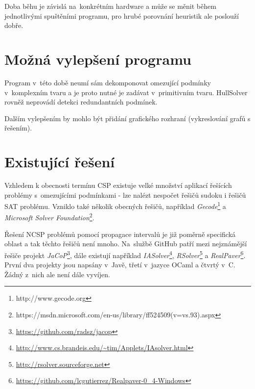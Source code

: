 Doba běhu je závislá na~konkrétním hardware a může se měnit během jednotlivými spuštěními programu, pro hrubé porovnání heuristik ale poslouží dobře.


\section{Možná vylepšení programu}
Program v~této době neumí sám dekomponovat omezující podmínky v~komplexním tvaru a je proto nutné je zadávat v~primitivním tvaru. HullSolver rovněž neprovádí detekci redundantních podmínek.

Dalším vylepšením by mohlo být přidání grafického rozhraní (vykreslování grafů s řešením).






\section{Existující řešení}
Vzhledem k obecnosti termínu CSP existuje velké množství aplikací řešících problémy s~omezujícími podmínkami - lze nalézt nespočet řešičů sudoku i řešičů SAT problému. Vzniklo také několik obecných řešičů, například \emph{Gecode}\footnote{http://www.gecode.org} a \emph{Microsoft Solver Foundation}\footnote{https://msdn.microsoft.com/en-us/library/ff524509(v=vs.93).aspx}.

Řešení NCSP problémů pomocí propagace intervalů je již poměrně specifická oblast a tak těchto řešičů není mnoho. Na~službě GitHub patří mezi nejznámější řešiče projekt \emph{JaCoP}\footnote{\url{https://github.com/radsz/jacop}}, dále existují například \emph{IASolver}\footnote{\url{http://www.cs.brandeis.edu/~tim/Applets/IAsolver.html}}, \emph{RSolver}\footnote{\url{http://rsolver.sourceforge.net}} a \emph{RealPaver}\footnote{\url{https://github.com/lcgutierrez/Realpaver-0\_4-Windows}}. První dva projekty jsou napsány v~Javě, třetí v~jazyce OCaml a čtvrtý v~C. Žádný z~nich ale není dále vyvíjen.
